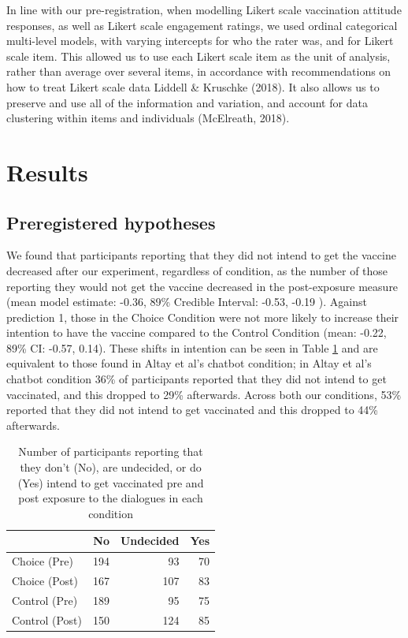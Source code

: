 \documentclass[
  english,
  ,jou,floatsintext]{apa6}
\begin{document}
In line with our pre-registration, when modelling Likert scale vaccination attitude responses, as well as Likert scale engagement ratings, we used ordinal categorical multi-level models, with varying intercepts for who the rater was, and for Likert scale item. This allowed us to use each Likert scale item as the unit of analysis, rather than average over several items, in accordance with recommendations on how to treat Likert scale data Liddell \& Kruschke (2018). It also allows us to preserve and use all of the information and variation, and account for data clustering within items and individuals (McElreath, 2018).

\hypertarget{results}{%
\section{Results}\label{results}}

\hypertarget{preregistered-hypotheses-1}{%
\subsection{Preregistered hypotheses}\label{preregistered-hypotheses-1}}

We found that participants reporting that they did not intend to get the vaccine decreased after our experiment, regardless of condition, as the number of those reporting they would not get the vaccine decreased in the post-exposure measure (mean model estimate: -0.36, 89\% Credible Interval: -0.53, -0.19 ). Against prediction 1, those in the Choice Condition were not more likely to increase their intention to have the vaccine compared to the Control Condition (mean: -0.22, 89\% CI: -0.57, 0.14). These shifts in intention can be seen in Table \ref{tab:intchange} and are equivalent to those found in Altay et al's chatbot condition; in Altay et al's chatbot condition 36\% of participants reported that they did not intend to get vaccinated, and this dropped to 29\% afterwards. Across both our conditions, 53\% reported that they did not intend to get vaccinated and this dropped to 44\% afterwards.

\begin{table}

\caption{\label{tab:intchange}Number of participants reporting that they don't (No), are undecided, or do (Yes) intend to get vaccinated pre and post exposure to the dialogues in each condition}
\centering
\begin{tabular}[t]{l|r|r|r}
\hline
  & No & Undecided & Yes\\
\hline
Choice (Pre) & 194 & 93 & 70\\
\hline
Choice (Post) & 167 & 107 & 83\\
\hline
Control (Pre) & 189 & 95 & 75\\
\hline
Control (Post) & 150 & 124 & 85\\
\hline
\end{tabular}
\end{table}
\end{document}
